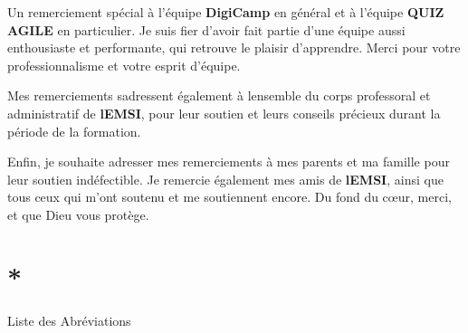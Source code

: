 \documentclass[12pt,a4paper,twoside,openright]{report}
\let\origchapter\chapter
\renewcommand{\chapter}[1]{%
  \cleardoublepage%
  \origchapter{#1}%
}
\begin{document}
Un remerciement spécial à l'équipe \textbf{DigiCamp} en général et à
l'équipe \textbf{QUIZ AGILE} en particulier. Je suis fier d'avoir fait
partie d'une équipe aussi enthousiaste et performante, qui retrouve le
plaisir d'apprendre. Merci pour votre professionnalisme et votre esprit
d'équipe.

Mes remerciements s\textquotesingle adressent également à
l\textquotesingle ensemble du corps professoral et administratif de
\textbf{l\textquotesingle EMSI}, pour leur soutien et leurs conseils
précieux durant la période de la formation.

Enfin, je souhaite adresser mes remerciements à mes parents et ma
famille pour leur soutien indéfectible. Je remercie également mes amis
de \textbf{l\textquotesingle EMSI}, ainsi que tous ceux qui m'ont
soutenu et me soutiennent encore. Du fond du cœur, merci, et que Dieu
vous protège.

\chapter*{Liste des Abréviations}
\end{document}
